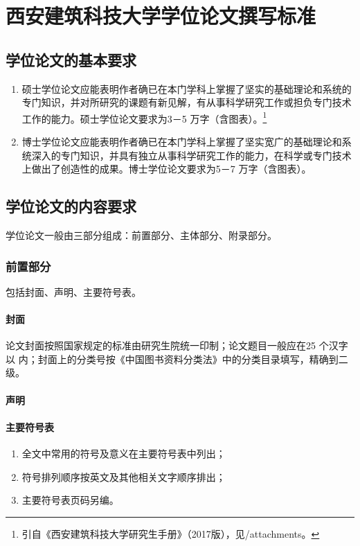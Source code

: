 \chapter{西安建筑科技大学学位论文撰写标准}
\section{学位论文的基本要求}
\begin{enumerate}
\item 硕士学位论文应能表明作者确已在本门学科上掌握了坚实的基础理论和系统的专门知识，并对所研究的课题有新见解，有从事科学研究工作或担负专门技术工作的能力。硕士学位论文要求为3－5 万字（含图表）。\footnote{引自《西安建筑科技大学研究生手册》（2017版），见/attachments。}
\item 博士学位论文应能表明作者确已在本门学科上掌握了坚实宽广的基础理论和系统深入的专门知识，并具有独立从事科学研究工作的能力，在科学或专门技术上做出了创造性的成果。博士学位论文要求为5－7 万字（含图表）。
\end{enumerate}

\section{学位论文的内容要求}
学位论文一般由三部分组成：前置部分、主体部分、附录部分。

\subsection{前置部分}
包括封面、声明、主要符号表。
\subsubsection{封面}
论文封面按照国家规定的标准由研究生院统一印制；论文题目一般应在25 个汉字以
内；封面上的分类号按《中国图书资料分类法》中的分类目录填写，精确到二级。

\subsubsection{声明}
\declaration

\subsubsection{主要符号表}
\begin{enumerate}[1)]
    \item 全文中常用的符号及意义在主要符号表中列出；
    \item 符号排列顺序按英文及其他相关文字顺序排出；
    \item 主要符号表页码另编。
\end{enumerate}

